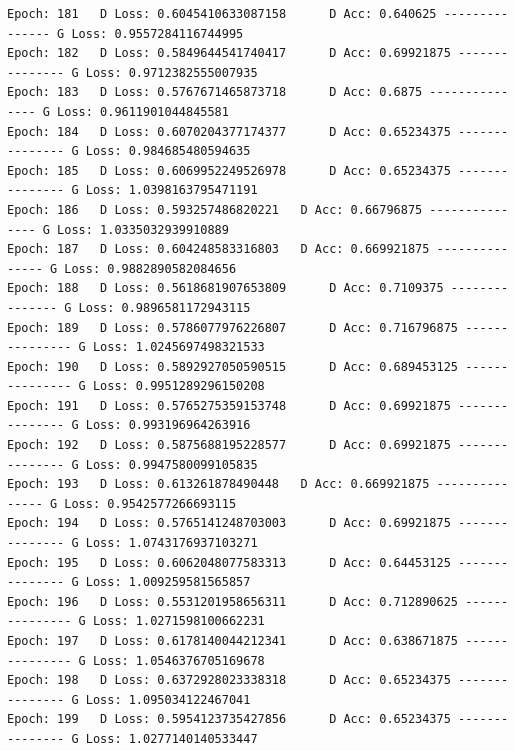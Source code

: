 \documentclass[11pt]{article}
\begin{document}
\begin{Verbatim}[commandchars=\\\{\}]
Epoch: 181 	 D Loss: 0.6045410633087158 	 D Acc: 0.640625 --------------- G Loss: 0.9557284116744995
Epoch: 182 	 D Loss: 0.5849644541740417 	 D Acc: 0.69921875 --------------- G Loss: 0.9712382555007935
Epoch: 183 	 D Loss: 0.5767671465873718 	 D Acc: 0.6875 --------------- G Loss: 0.9611901044845581
Epoch: 184 	 D Loss: 0.6070204377174377 	 D Acc: 0.65234375 --------------- G Loss: 0.984685480594635
Epoch: 185 	 D Loss: 0.6069952249526978 	 D Acc: 0.65234375 --------------- G Loss: 1.0398163795471191
Epoch: 186 	 D Loss: 0.593257486820221 	 D Acc: 0.66796875 --------------- G Loss: 1.0335032939910889
Epoch: 187 	 D Loss: 0.604248583316803 	 D Acc: 0.669921875 --------------- G Loss: 0.9882890582084656
Epoch: 188 	 D Loss: 0.5618681907653809 	 D Acc: 0.7109375 --------------- G Loss: 0.9896581172943115
Epoch: 189 	 D Loss: 0.5786077976226807 	 D Acc: 0.716796875 --------------- G Loss: 1.0245697498321533
Epoch: 190 	 D Loss: 0.5892927050590515 	 D Acc: 0.689453125 --------------- G Loss: 0.9951289296150208
Epoch: 191 	 D Loss: 0.5765275359153748 	 D Acc: 0.69921875 --------------- G Loss: 0.993196964263916
Epoch: 192 	 D Loss: 0.5875688195228577 	 D Acc: 0.69921875 --------------- G Loss: 0.9947580099105835
Epoch: 193 	 D Loss: 0.613261878490448 	 D Acc: 0.669921875 --------------- G Loss: 0.9542577266693115
Epoch: 194 	 D Loss: 0.5765141248703003 	 D Acc: 0.69921875 --------------- G Loss: 1.0743176937103271
Epoch: 195 	 D Loss: 0.6062048077583313 	 D Acc: 0.64453125 --------------- G Loss: 1.009259581565857
Epoch: 196 	 D Loss: 0.5531201958656311 	 D Acc: 0.712890625 --------------- G Loss: 1.0271598100662231
Epoch: 197 	 D Loss: 0.6178140044212341 	 D Acc: 0.638671875 --------------- G Loss: 1.0546376705169678
Epoch: 198 	 D Loss: 0.6372928023338318 	 D Acc: 0.65234375 --------------- G Loss: 1.095034122467041
Epoch: 199 	 D Loss: 0.5954123735427856 	 D Acc: 0.65234375 --------------- G Loss: 1.0277140140533447

    \end{Verbatim}

    \begin{center}
    \end{center}
    { \hspace*{\fill} \\}
    
    \begin{center}
    \end{center}
    { \hspace*{\fill} \\}
    
\end{document}
